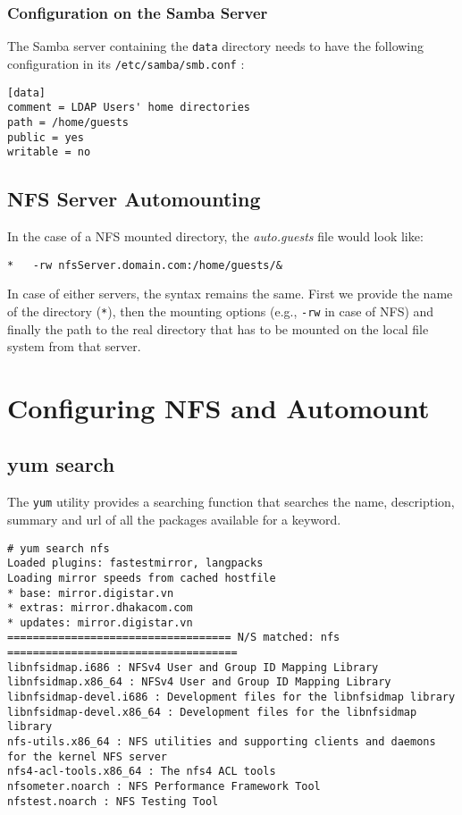 \subsubsection{Configuration on the Samba Server}
The Samba server containing the \verb|data| directory needs to have the following configuration in its \verb|/etc/samba/smb.conf| :

\vspace{-10pt}
\begin{verbatim}
[data]
comment = LDAP Users' home directories
path = /home/guests
public = yes
writable = no
\end{verbatim}

\subsection{NFS Server Automounting}

In the case of a NFS mounted directory, the \textit{auto.guests} file would look like:

\begin{verbatim}
*	-rw	nfsServer.domain.com:/home/guests/&
\end{verbatim}

\noindent
In case of either servers, the syntax remains the same. First we provide the name of the directory (\verb|*|), then the mounting options (e.g., \verb|-rw| in case of NFS) and finally the path to the real directory that has to be mounted on the local file system from that server.

\section{Configuring NFS and Automount}
\subsection{yum search}
\vspace{-10pt}
The \verb|yum| utility provides a searching function that searches the name, description, summary and url of all the packages available for a keyword. 

\vspace{-15pt}
\begin{verbatim}
# yum search nfs
Loaded plugins: fastestmirror, langpacks
Loading mirror speeds from cached hostfile
* base: mirror.digistar.vn
* extras: mirror.dhakacom.com
* updates: mirror.digistar.vn
=================================== N/S matched: nfs ====================================
libnfsidmap.i686 : NFSv4 User and Group ID Mapping Library
libnfsidmap.x86_64 : NFSv4 User and Group ID Mapping Library
libnfsidmap-devel.i686 : Development files for the libnfsidmap library
libnfsidmap-devel.x86_64 : Development files for the libnfsidmap library
nfs-utils.x86_64 : NFS utilities and supporting clients and daemons for the kernel NFS server
nfs4-acl-tools.x86_64 : The nfs4 ACL tools
nfsometer.noarch : NFS Performance Framework Tool
nfstest.noarch : NFS Testing Tool
\end{verbatim}

